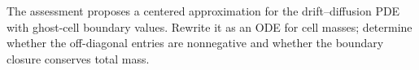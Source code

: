 \documentclass[12pt,a4paper,oneside]{book}
\begin{document}
\begin{exercise}
\label{ex:centralpositivity}
\label{src:p8q1}
The assessment proposes a centered approximation for the drift--diffusion
PDE with ghost-cell boundary values. Rewrite it as an ODE for cell masses;
determine whether the off-diagonal entries are nonnegative and whether
the boundary closure conserves total mass.
\end{exercise}
\end{document}
